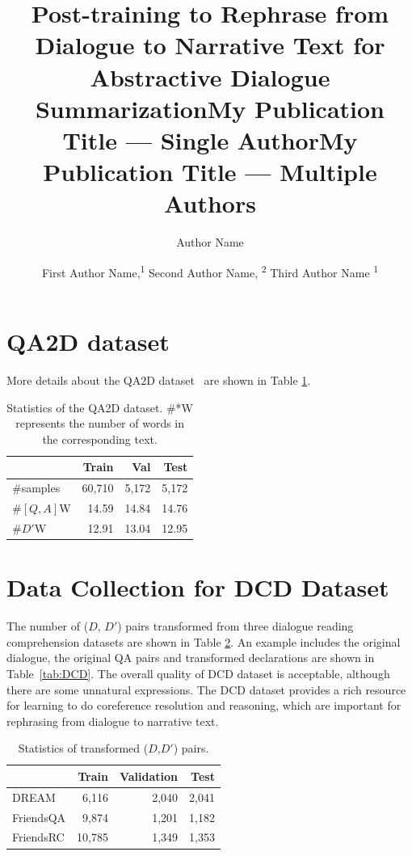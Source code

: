 \documentclass[letterpaper]{article} %
\title{Post-training to Rephrase from Dialogue to Narrative Text for Abstractive Dialogue Summarization}
\author{
}
\title{My Publication Title --- Single Author}
\author {
    Author Name
}
\title{My Publication Title --- Multiple Authors}
\author {
    First Author Name,\textsuperscript{\rm 1}
    Second Author Name, \textsuperscript{\rm 2}
    Third Author Name \textsuperscript{\rm 1}
}
\begin{document}
\maketitle

\appendix

\section{QA2D dataset}
More details about the QA2D dataset~\cite{demszky2018transforming} are shown in Table \ref{tab:qa2ddata}.
\begin{table}[h]
	\centering
	\begin{tabular}{lrrr}
		\toprule[1pt]
		\textbf{} & \textbf{Train}& \textbf{Val}& \textbf{Test} \\ 
		\midrule[1pt]
		{\#samples} & 60,710 &5,172&5,172\\
		{\#$[Q,A]$W} & 14.59 & 14.84&14.76\\
		{\#$D'$W} &12.91 &13.04&12.95\\
		\bottomrule[1pt]
	\end{tabular}
	\caption{Statistics of the QA2D dataset. \#*W represents the number of words in the corresponding text.}
	\label{tab:qa2ddata}
\end{table}

\section{Data Collection for DCD Dataset}

The number of ($D$, $D'$) pairs transformed from three dialogue reading comprehension datasets are shown in Table \ref{tab:qa2dstatistics}. An example includes the original dialogue, the original QA pairs and transformed declarations are shown in Table~\ref{tab:DCD}. The overall quality of DCD dataset is acceptable, although there are some unnatural expressions. The DCD dataset provides a rich resource for learning to do coreference resolution and reasoning, which are important for rephrasing from dialogue to narrative text.

\begin{table}[h]
	\centering
	\begin{tabular}{lrrr}
		\toprule[1pt]
		\textbf{} & \textbf{Train}& \textbf{Validation}& \textbf{Test} \\ 
		\midrule[1pt]
		{DREAM} & 6,116 &2,040&2,041\\
		{FriendsQA}& 9,874 & 1,201&1,182\\
		{FriendsRC} &10,785&1,349&1,353\\
		\bottomrule[1pt]
	\end{tabular}
	\caption{Statistics of transformed ($D$,$D'$) pairs.}
	\label{tab:qa2dstatistics}
\end{table}
\end{document}

